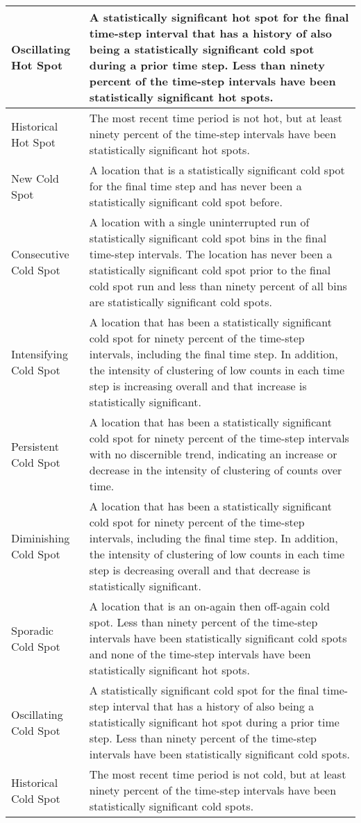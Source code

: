 \begin{longtable}{|l|p{10cm}|}
Oscillating Hot Spot & A statistically significant hot spot for the final time-step interval that has a history of also being a statistically significant cold spot during a prior time step. Less than ninety percent of the time-step intervals have been statistically significant hot spots. \\ \hline
Historical Hot Spot & The most recent time period is not hot, but at least ninety percent of the time-step intervals have been statistically significant hot spots. \\ \hline
New Cold Spot & A location that is a statistically significant cold spot for the final time step and has never been a statistically significant cold spot before. \\ \hline
Consecutive Cold Spot & A location with a single uninterrupted run of statistically significant cold spot bins in the final time-step intervals. The location has never been a statistically significant cold spot prior to the final cold spot run and less than ninety percent of all bins are statistically significant cold spots. \\ \hline
Intensifying Cold Spot & A location that has been a statistically significant cold spot for ninety percent of the time-step intervals, including the final time step. In addition, the intensity of clustering of low counts in each time step is increasing overall and that increase is statistically significant. \\ \hline
Persistent Cold Spot & A location that has been a statistically significant cold spot for ninety percent of the time-step intervals with no discernible trend, indicating an increase or decrease in the intensity of clustering of counts over time. \\ \hline
Diminishing Cold Spot & A location that has been a statistically significant cold spot for ninety percent of the time-step intervals, including the final time step. In addition, the intensity of clustering of low counts in each time step is decreasing overall and that decrease is statistically significant. \\ \hline
Sporadic Cold Spot & A location that is an on-again then off-again cold spot. Less than ninety percent of the time-step intervals have been statistically significant cold spots and none of the time-step intervals have been statistically significant hot spots. \\ \hline
Oscillating Cold Spot & A statistically significant cold spot for the final time-step interval that has a history of also being a statistically significant hot spot during a prior time step. Less than ninety percent of the time-step intervals have been statistically significant cold spots. \\ \hline
Historical Cold Spot & The most recent time period is not cold, but at least ninety percent of the time-step intervals have been statistically significant cold spots. \\ \hline

\end{longtable}

